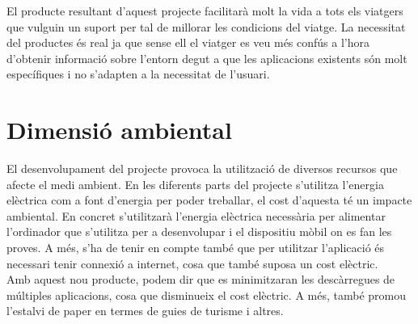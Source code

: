 El producte resultant d’aquest projecte facilitarà molt la vida a tots els viatgers
que vulguin un suport per tal de millorar les condicions del viatge. La necessitat del productes és real ja que sense ell el viatger es veu més confús a l’hora
d’obtenir informació sobre l’entorn degut a que les aplicacions existents són
molt específiques i no s’adapten a la necessitat de l’usuari.

\clearpage
\section{Dimensió ambiental}
El desenvolupament del projecte provoca la utilització de diversos recursos
que afecte el medi ambient. En les diferents parts del projecte s’utilitza l’energia elèctrica com a font d’energia per poder treballar, el cost d’aquesta té un
impacte ambiental. En concret s’utilitzarà l’energia elèctrica necessària per alimentar l’ordinador que s’utilitza per a desenvolupar i el dispositiu mòbil on
es fan les proves. A més, s’ha de tenir en compte també que per utilitzar l’aplicació és necessari tenir connexió a internet, cosa que també suposa un cost
elèctric.\\


Amb aquest nou producte, podem dir que es minimitzaran les descàrregues
de múltiples aplicacions, cosa que disminueix el cost elèctric. A més, també
promou l’estalvi de paper en termes de guies de turisme i altres.
	

